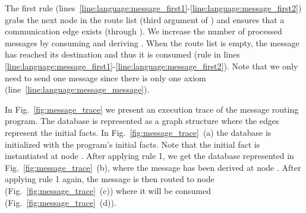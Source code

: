 The first rule
(lines~\ref{line:language:message_first1}-\ref{line:language:message_first2})
grabs the next node in the route list (third argument of ) and
ensures that a communication edge exists (through ). We
increase the number of processed messages by consuming 
and deriving .  When the route list is empty, the
message has reached its destination and thus it is consumed (rule in lines
\ref{line:language:message_first1}-\ref{line:language:message_first2}).  Note
that we only need to send one message since there is only one 
axiom (line~\ref{line:language:message_message}).

In Fig.~\ref{fig:message_trace} we present an execution trace of the message
routing program.  The database is represented as a graph structure where the
edges represent the  initial facts. In
Fig.~\ref{fig:message_trace}~(a) the database is initialized with the program's
initial facts. Note that the initial  fact is instantiated at
node . After applying rule 1, we get the database represented in
Fig.~\ref{fig:message_trace}~(b), where the message has been derived at node
. After applying rule 1 again, the message is then routed to node
 (Fig.~\ref{fig:message_trace}~(c)) where it will be consumed
(Fig.~\ref{fig:message_trace}~(d)).

